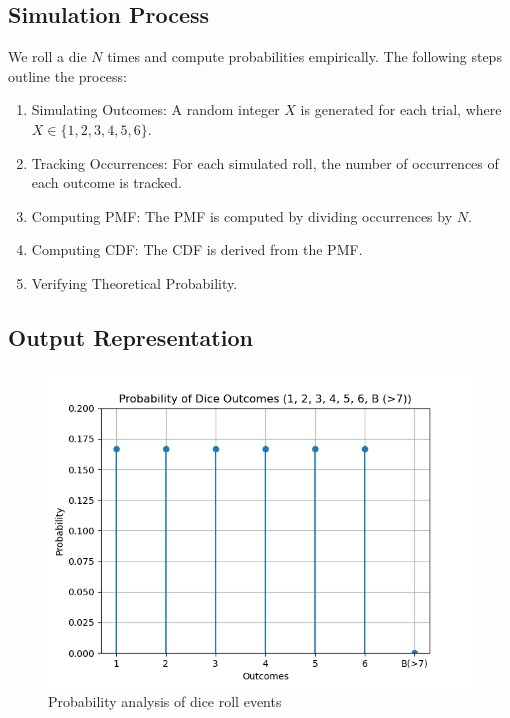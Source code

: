 \documentclass[journal]{IEEEtran}
\numberwithin{equation}{enumi}
\numberwithin{figure}{enumi}
\begin{document}
\subsection*{Simulation Process}
We roll a die $ N $ times and compute probabilities empirically. The following steps outline the process:
\begin{enumerate}
    \item Simulating Outcomes: A random integer $ X $ is generated for each trial, where $ X \in \{1, 2, 3, 4, 5, 6\} $.
    \item Tracking Occurrences: For each simulated roll, the number of occurrences of each outcome is tracked.
    \item Computing PMF: The PMF is computed by dividing occurrences by $ N $.
    \item Computing CDF: The CDF is derived from the PMF.
    \item Verifying Theoretical Probability.
\end{enumerate}

\subsection*{Output Representation}
\begin{figure}[h!]
    \centering
    \includegraphics[width=\columnwidth]{figs/fig.png}
    \caption{Probability analysis of dice roll events}
    \label{fig:event_probs}
\end{figure}
\end{document}
